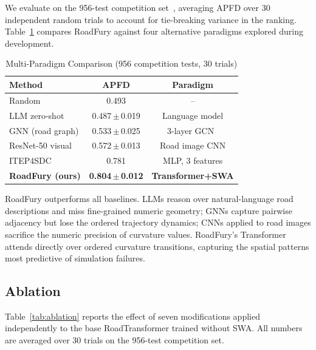 \documentclass[conference]{IEEEtran}
\begin{document}
We evaluate on the 956-test competition set~\cite{b8}, averaging APFD over 30 independent random trials to account for tie-breaking variance in the ranking.
Table~\ref{tab:results} compares RoadFury against four alternative paradigms explored during development.

\begin{table}[t]
\caption{Multi-Paradigm Comparison (956 competition tests, 30 trials)}
\vspace{-4pt}
\begin{center}{\small
\setlength{\tabcolsep}{3pt}
\begin{tabular}{lcc}
\toprule
\textbf{Method} & \textbf{APFD} & \textbf{Paradigm} \\
\midrule
Random                   & 0.493              & -- \\
LLM zero-shot            & 0.487\,$\pm$\,0.019 & Language model \\
GNN (road graph)         & 0.533\,$\pm$\,0.025 & 3-layer GCN~\cite{b10} \\
ResNet-50 visual         & 0.572\,$\pm$\,0.013 & Road image CNN \\
ITEP4SDC                 & 0.781              & MLP, 3 features \\
\textbf{RoadFury (ours)} & \textbf{0.804\,$\pm$\,0.012} & \textbf{Transformer+SWA} \\
\bottomrule
\end{tabular}}
\label{tab:results}
\end{center}
\vspace{-6pt}
\end{table}

RoadFury outperforms all baselines.
LLMs reason over natural-language road descriptions and miss fine-grained numeric geometry; GNNs capture pairwise adjacency but lose the ordered trajectory dynamics; CNNs applied to road images sacrifice the numeric precision of curvature values.
RoadFury's Transformer attends directly over ordered curvature transitions, capturing the spatial patterns most predictive of simulation failures.

\subsection{Ablation}

Table~\ref{tab:ablation} reports the effect of seven modifications applied independently to the base RoadTransformer trained without SWA.
All numbers are averaged over 30 trials on the 956-test competition set.
\end{document}
